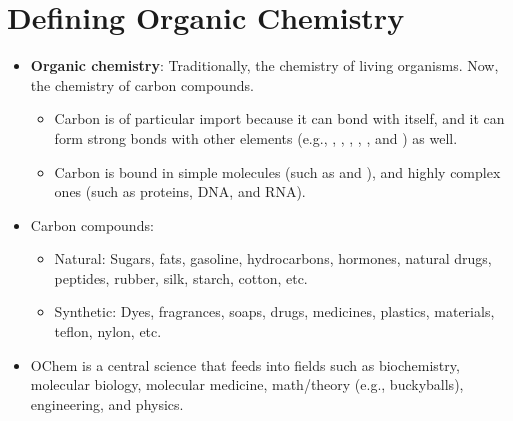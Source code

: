 \documentclass[../notes.tex]{subfiles}
\begin{document}
\section{Defining Organic Chemistry}
\begin{itemize}
    \item \textbf{Organic chemistry}: Traditionally, the chemistry of living organisms. Now, the chemistry of carbon compounds.
    \begin{itemize}
        \item Carbon is of particular import because it can bond with itself, and it can form strong bonds with other elements (e.g., , , , , , and ) as well.
        \item Carbon is bound in simple molecules (such as  and ), and highly complex ones (such as proteins, DNA, and RNA).
    \end{itemize}
    \item Carbon compounds:
    \begin{itemize}
        \item Natural: Sugars, fats, gasoline, hydrocarbons, hormones, natural drugs, peptides, rubber, silk, starch, cotton, etc.
        \item Synthetic: Dyes, fragrances, soaps, drugs, medicines, plastics, materials, teflon, nylon, etc.
    \end{itemize}
    \item OChem is a central science that feeds into fields such as biochemistry, molecular biology, molecular medicine, math/theory (e.g., buckyballs), engineering, and physics.
\end{itemize}
\end{document}
